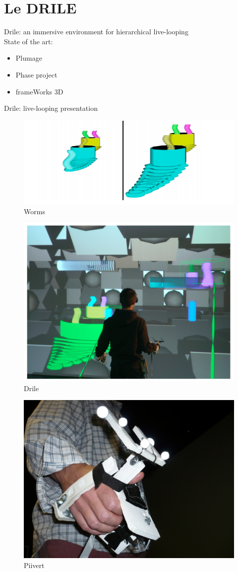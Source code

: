 \section{Le DRILE}

\begin{frame}
Drile: an immersive environment for hierarchical live-looping
\\
State of the art:
\begin{itemize}
\item Plumage
\item Phase project
\item frameWorks 3D
\end{itemize}
\end{frame}

\begin{frame}
Drile: live-looping presentation 
\end{frame}

\begin{frame}
\begin{figure}[ht]
	\centering
	\includegraphics[keepaspectratio,height=.2\linewidth,position=!h]{worms.png}
	\caption{Worms}
\end{figure}
\end{frame}

\begin{frame}
\begin{figure}[ht]
	\centering
	\includegraphics[keepaspectratio,height=.4\linewidth,position=!h]{drile.png}
	\caption{Drile}
\end{figure}
\end{frame}


\begin{frame}
\begin{figure}[ht]
	\centering
	\includegraphics[keepaspectratio,height=.4\linewidth,position=!h]{PIIVERT.jpg}
	\caption{Piivert}
\end{figure}
\end{frame}

